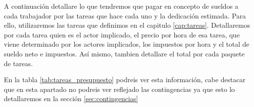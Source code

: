 \begin{table}[H]
    \centering
    \caption{Salarios netos medios por hora para cada rol (Glassdor)}
    \label{tab:presupuesto_roles}
\end{table}

A continuación detallare lo que tendremos que pagar en concepto de sueldos a cada trabajador por las tareas que hace cada uno y la dedicación estimada. Para ello, utilizaremos
las tareas que definimos en el capitulo \ref{cap:tareas}. Detallaremos por cada tarea quien es el actor implicado, el precio por hora de esa tarea, que viene determinado
por los actores implicados, los impuestos por hora y el total de sueldo neto e impuestos. Así mismo, tambien detallare el total por cada paquete de tareas.

En la tabla \ref{tab:tareas_presupuesto} podreis ver esta información, cabe destacar que en esta apartado no podreis ver reflejado las contingencias ya que esto 
lo detallaremos en la sección \ref{sec:contingencias}


